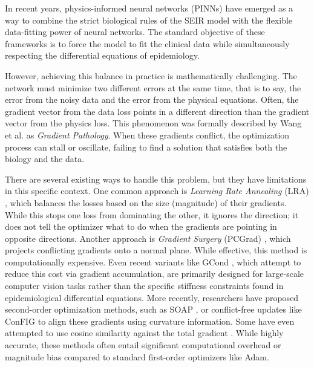 \documentclass[11pt]{article}
\begin{document}
In recent years, physics-informed neural networks (PINNs) \cite{raissi2019physics, karniadakis2021physics} have emerged as a way to combine the strict biological rules of the SEIR model with the flexible data-fitting power of neural networks. The standard objective of these frameworks is to force the model to fit the clinical data while simultaneously respecting the differential equations of epidemiology.

However, achieving this balance in practice is mathematically challenging. The network must minimize two different errors at the same time, that is to say, the error from the noisy data and the error from the physical equations. Often, the gradient vector from the data loss points in a different direction than the gradient vector from the physics loss. This phenomenon was formally described by Wang et al. \cite{wang2021understanding} as \textit{Gradient Pathology}. When these gradients conflict, the optimization process can stall or oscillate, failing to find a solution that satisfies both the biology and the data.

There are several existing ways to handle this problem, but they have limitations in this specific context. One common approach is \textit{Learning Rate Annealing} (LRA) \cite{wang2021understanding}, which balances the losses based on the size (magnitude) of their gradients. While this stops one loss from dominating the other, it ignores the direction; it does not tell the optimizer what to do when the gradients are pointing in opposite directions. Another approach is \textit{Gradient Surgery} (PCGrad) \cite{yu2020gradient}, which projects conflicting gradients onto a normal plane. While effective, this method is computationally expensive. Even recent variants like GCond \cite{alves2025gcond}, which attempt to reduce this cost via gradient accumulation, are primarily designed for large-scale computer vision tasks rather than the specific stiffness constraints found in epidemiological differential equations. More recently, researchers have proposed second-order optimization methods, such as SOAP \cite{wang2025gradient}, or conflict-free updates like ConFIG \cite{liu2024config} to align these gradients using curvature information. Some have even attempted to use cosine similarity against the total gradient \cite{wang2024cosine}. While highly accurate, these methods often entail significant computational overhead or magnitude bias compared to standard first-order optimizers like Adam.
\end{document}
